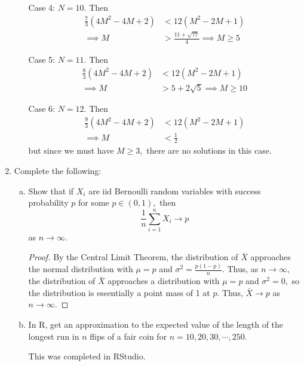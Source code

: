 \documentclass{article}
\begin{document}
\begin{enumerate}
\begin{enumerate}[(a)]
\begin{soln}
				Case 4: $N=10.$ Then 
				\begin{align*}
					\frac{7}{3}(4M^2-4M+2) &< 12(M^2-2M+1) \\
					\implies M &> \frac{11+\sqrt{77}}{4} \implies M\ge 5
				\end{align*} 

				Case 5: $N=11.$ Then 
				\begin{align*}
					\frac{8}{3}(4M^2-4M+2) &< 12(M^2-2M+1) \\
					\implies M &> 5+2\sqrt{5}\implies M\ge 10
				\end{align*} 

				Case 6: $N=12.$ Then
				\begin{align*}
					\frac{9}{3}(4M^2-4M+2) &< 12(M^2-2M+1) \\
					\implies M &< \frac{1}{2}
				\end{align*} but since we must have $M\ge 3,$ there are no solutions in this case.

			\end{soln}

		\end{enumerate}

	\item Complete the following:
		\begin{enumerate}[(a)]
			\item Show that if $X_i$ are iid Bernoulli random variables with success probability $p$ for some $p\in(0, 1),$ then \[\frac{1}{n}\sum_{i=1}^n X_i\to p\] as $n\to\infty.$
				\begin{proof}
					By the Central Limit Theorem, the distribution of $\bar{X}$ approaches the normal distribution with $\mu=p$ and $\sigma^2=\frac{p(1-p)}{n}.$ Thus, as $n\to\infty,$ the distribution of $\bar{X}$ approaches a distribution with $\mu=p$ and $\sigma^2=0,$ so the distribution is essentially a point mass of 1 at $p.$ Thus, $\bar{X}\to p$ as $n\to\infty.$
					
				\end{proof}

			\item In R, get an approximation to the expected value of the length of the longest run in $n$ flips of a fair coin for $n=10, 20, 30, \cdots, 250.$
				\begin{answer*}
					This was completed in RStudio. 
				\end{answer*}


\end{enumerate}
\end{enumerate}
\end{document}
